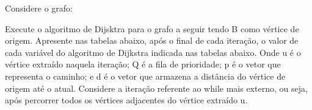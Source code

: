\documentclass[16pt]{examdesign}
\begin{document}
\begin{fillin}[title={},
                    rearrange=no,resetcounter=no,suppressprefix]
\begin{question}
  \pagebreak
  \end{question}          
          \begin{question}
		[6 pontos] Considere o grafo: 
\begin{center}
\end{center}

Execute o algoritmo de Dijsktra para o grafo a seguir tendo B como vértice de origem. 
Apresente nas tabelas abaixo, após o final de cada iteração, o valor de cada variável do algoritmo de Dijkstra indicada nas tabelas abaixo.
Onde u é o vértice extraído naquela iteração; Q é a fila de prioridade; p é o vetor  que representa o caminho;  e d é o vetor que  armazena a distância do vértice de origem até o atual. 
Considere a iteração referente ao while mais externo, ou seja, após percorrer todos os vértices adjacentes do vértice extraído u.


\end{question}
\end{fillin}
\end{document}

